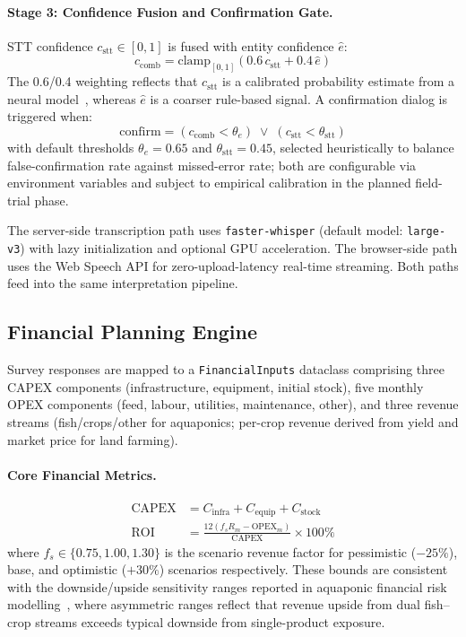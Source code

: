 \documentclass[runningheads]{llncs}
\begin{document}
\paragraph{Stage 3: Confidence Fusion and Confirmation Gate.}
STT confidence $c_{\mathrm{stt}} \in [0,1]$ is fused with entity
confidence $\hat{e}$:
\begin{equation}
  c_{\mathrm{comb}} =
    \mathrm{clamp}_{[0,1]}\!\left(0.6\,c_{\mathrm{stt}} + 0.4\,\hat{e}\right)
  \label{eq:fusion}
\end{equation}
The 0.6/0.4 weighting reflects that $c_{\mathrm{stt}}$ is a
calibrated probability estimate from a neural model~\cite{ref10},
whereas $\hat{e}$ is a coarser rule-based signal.
A confirmation dialog is triggered when:
\begin{equation}
  \mathrm{confirm} =
    (c_{\mathrm{comb}} < \theta_{e}) \;\lor\;
    (c_{\mathrm{stt}} < \theta_{\mathrm{stt}})
  \label{eq:confirm}
\end{equation}
with default thresholds $\theta_{e}=0.65$ and
$\theta_{\mathrm{stt}}=0.45$, selected heuristically to balance
false-confirmation rate against missed-error rate; both are
configurable via environment variables and subject to empirical
calibration in the planned field-trial phase.

The server-side transcription path uses \texttt{faster-whisper}
(default model: \texttt{large-v3}) with lazy initialization and
optional GPU acceleration. The browser-side path uses the Web Speech
API for zero-upload-latency real-time streaming. Both paths feed into
the same interpretation pipeline.

\subsection{Financial Planning Engine}

Survey responses are mapped to a \texttt{FinancialInputs} dataclass
comprising three CAPEX components (infrastructure, equipment, initial
stock), five monthly OPEX components (feed, labour, utilities,
maintenance, other), and three revenue streams (fish/crops/other for
aquaponics; per-crop revenue derived from yield and market price for
land farming).

\paragraph{Core Financial Metrics.}
\begin{align}
  \mathrm{CAPEX} &= C_{\mathrm{infra}} + C_{\mathrm{equip}}
                    + C_{\mathrm{stock}} \label{eq:capex}\\
  \mathrm{ROI}   &= \frac{12(f_s R_m - \mathrm{OPEX}_m)}
                          {\mathrm{CAPEX}} \times 100\%
                    \label{eq:roi}
\end{align}
where $f_s \in \{0.75, 1.00, 1.30\}$ is the scenario revenue factor
for pessimistic ($-25\%$), base, and optimistic ($+30\%$) scenarios
respectively. These bounds are consistent with the downside/upside
sensitivity ranges reported in aquaponic financial risk
modelling~\cite{ref4}, where asymmetric ranges reflect that revenue
upside from dual fish--crop streams exceeds typical downside from
single-product exposure.
\end{document}
